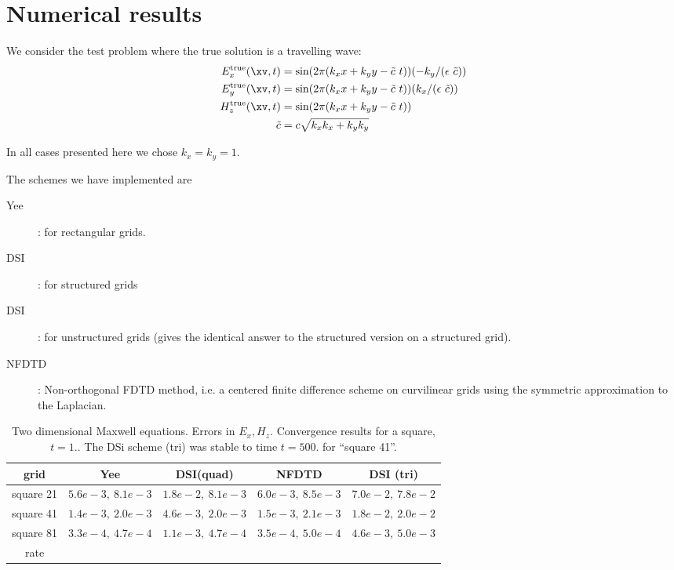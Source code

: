 \documentclass[10pt]{article}
\begin{document}
\section{Numerical results}

We consider the test problem where the true solution is a travelling wave:
\begin{align*}
 E_x^{\rm true}(\xv,t) &= \sin(2\pi (k_x  x +k_y y -\cc~t )) (-k_y/(\epsilon~\cc)) \\
 E_y^{\rm true}(\xv,t) &= \sin(2\pi (k_x  x +k_y y -\cc~t )) ( k_x/(\epsilon~\cc))  \\
 H_z^{\rm true}(\xv,t) &= \sin(2\pi (k_x  x +k_y y -\cc~t ))   \\
\cc &= c \sqrt{ k_x k_x+k_y k_y }
\end{align*}

In all cases presented here we chose $k_x=k_y=1$.


The schemes we have implemented are
\begin{description}
  \item[Yee] : for rectangular grids.
  \item[DSI] : for structured grids
  \item[DSI] : for unstructured grids (gives the identical answer to the structured version on a structured grid).
  \item[NFDTD] : Non-orthogonal FDTD method, i.e. a centered finite difference scheme on curvilinear grids
     using the symmetric approximation to the Laplacian.
\end{description}


\begin{table}[hbt]
\begin{center}
\begin{tabular}{|c|c|c|c|c|} \hline 
  grid         & Yee                 &   DSI(quad)         & NFDTD              &   DSI (tri)       \\   \hline\hline 
  square 21    & $5.6e-3,~8.1e-3$  & $1.8e-2,~8.1e-3$  & $6.0e-3,~8.5e-3$ & $7.0e-2,~7.8e-2$  \\ 
  square 41    & $1.4e-3,~2.0e-3$  & $4.6e-3,~2.0e-3$  & $1.5e-3,~2.1e-3$ & $1.8e-2,~2.0e-2$  \\ 
  square 81    & $3.3e-4,~4.7e-4$  & $1.1e-3,~4.7e-4$  & $3.5e-4,~5.0e-4$ & $4.6e-3,~5.0e-3$         \\ 
   rate        &                     &                     &                    &                    \\ \hline
\end{tabular}
\end{center}
\caption{Two dimensional Maxwell equations. Errors in $E_x, H_z$. Convergence results for a square, $t=1.$.
   The DSi scheme (tri) was stable to time $t=500.$ for ``square 41''.}
 \label{tab:conv square} 
\end{table}
\end{document}
